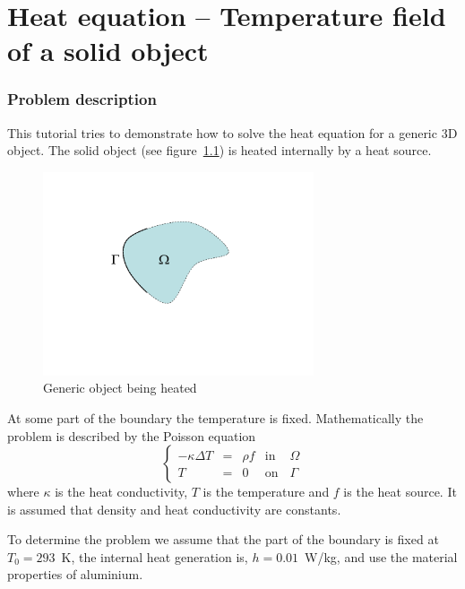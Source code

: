 \chapter{Heat equation -- Temperature field of a solid object}



\subsection*{Problem description}

This tutorial tries to demonstrate how to solve the heat equation 
for a generic 3D object. The solid object 
(see figure~\ref{fg:object1}) is heated internally by a heat source.
\begin{figure}
\begin{center}
\includegraphics[width=80mm, viewport=100 100 760 520,clip]{domain}
\caption{Generic object being heated}\label{fg:object1}
\end{center}
\end{figure}
At some part of the boundary the temperature is fixed.
Mathematically the problem is described by the Poisson equation
\begin{equation}
\left \{
\begin{array}{ccccc}
- \kappa \Delta T &= &\rho f & \mathrm{ in } \, \, & \Omega \\
T&=&0 & \mathrm{ on } & \Gamma
\end{array}
\right .
\end{equation}
where $\kappa$ is the heat conductivity, $T$  is the temperature 
and $f$ is the heat source. It is assumed that density 
and heat conductivity are constants. 

To determine the problem we assume that the part of the boundary is fixed at $T_0=293$~K,
the internal heat generation is, $h=0.01$~W/kg, and use the material properties of aluminium.


